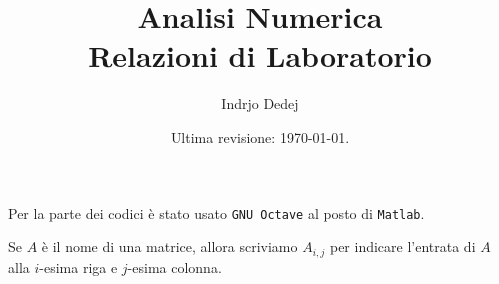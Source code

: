 


\title{Analisi Numerica \\ Relazioni di Laboratorio}
\author{Indrjo Dedej}
\date{Ultima revisione: \today{}.}



\maketitle

\tableofcontents

\begin{nota}
Per la parte dei codici è stato usato {\tt GNU Octave} al posto di {\tt Matlab}.
\end{nota}

\begin{nota}
Se \(A\) è il nome di una matrice, allora scriviamo \(A_{i,j}\) per indicare l'entrata di \(A\) alla \(i\)-esima riga e \(j\)-esima colonna.
\end{nota}






